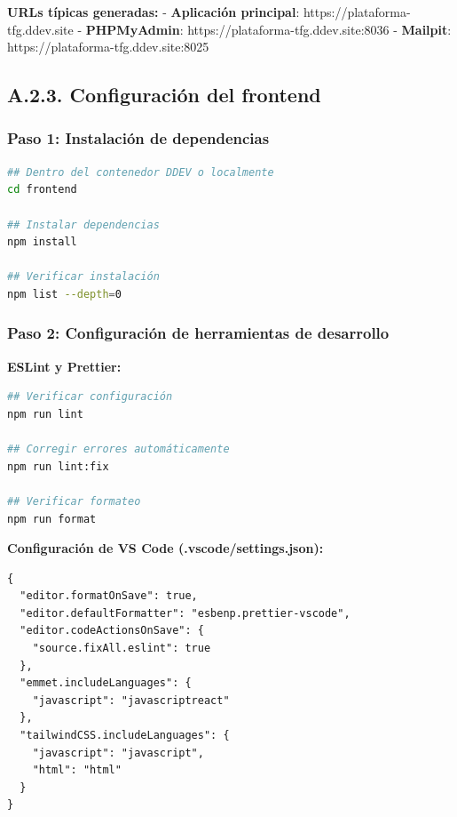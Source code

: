 \documentclass[12pt,a4paper,oneside]{report}
\begin{document}
\textbf{URLs típicas generadas:} - \textbf{Aplicación principal}:
https://plataforma-tfg.ddev.site - \textbf{PHPMyAdmin}:
https://plataforma-tfg.ddev.site:8036 - \textbf{Mailpit}:
https://plataforma-tfg.ddev.site:8025

\subsection{A.2.3. Configuración del
frontend}\label{a.2.3.-configuraciuxf3n-del-frontend}

\subsubsection{Paso 1: Instalación de
dependencias}\label{paso-1-instalaciuxf3n-de-dependencias}

\begin{lstlisting}[language=bash]
## Dentro del contenedor DDEV o localmente
cd frontend

## Instalar dependencias
npm install

## Verificar instalación
npm list --depth=0
\end{lstlisting}

\subsubsection{Paso 2: Configuración de herramientas de
desarrollo}\label{paso-2-configuraciuxf3n-de-herramientas-de-desarrollo}

\textbf{ESLint y Prettier:}

\begin{lstlisting}[language=bash]
## Verificar configuración
npm run lint

## Corregir errores automáticamente
npm run lint:fix

## Verificar formateo
npm run format
\end{lstlisting}

\textbf{Configuración de VS Code (.vscode/settings.json):}

\begin{lstlisting}
{
  "editor.formatOnSave": true,
  "editor.defaultFormatter": "esbenp.prettier-vscode",
  "editor.codeActionsOnSave": {
    "source.fixAll.eslint": true
  },
  "emmet.includeLanguages": {
    "javascript": "javascriptreact"
  },
  "tailwindCSS.includeLanguages": {
    "javascript": "javascript",
    "html": "html"
  }
}
\end{lstlisting}
\end{document}
